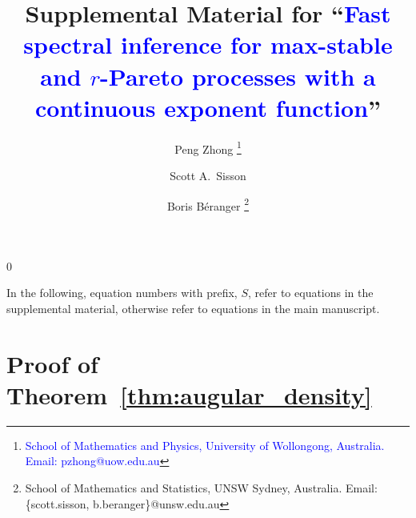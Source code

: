 \documentclass[12pt]{article}
\newcommand{\snum}{S}
\newcommand{\blind}{0}
\begin{document}
\def\spacingset#1{\renewcommand{\baselinestretch}%
{#1}\small\normalsize} \spacingset{1}

\newcommand{\PZ}{\textcolor{blue}}

\newcommand{\symfoot}[2]{%
  \begingroup
  \renewcommand{\thefootnote}{\fnsymbol{footnote}}%
  \setcounter{footnote}{#1}%
  \footnote{#2}%
  \endgroup
}
\newcommand{\symfootmark}[1]{%
  \begingroup
  \renewcommand{\thefootnote}{\fnsymbol{footnote}}%
  \setcounter{footnote}{#1}%
  \footnotemark%
  \endgroup
}

\title{\bf Supplemental Material for ``\PZ{Fast spectral inference for max-stable and $r$-Pareto processes with a continuous exponent function}''}
\blind{
  \author{Peng Zhong\symfoot{1}{\PZ{School of Mathematics and Physics, University of Wollongong, Australia. Email: pzhong@uow.edu.au}}
  \and Scott A.~Sisson\symfootmark{2}
  \and Boris B\'{e}ranger\symfoot{2}{School of Mathematics and Statistics, UNSW Sydney, Australia. Email: \{scott.sisson, b.beranger\}@unsw.edu.au}}
  \maketitle
} \fi

\baselineskip=26pt

\appendix

In the following, equation numbers with prefix, $\snum$, refer to equations in the supplemental material, otherwise refer to equations in the main manuscript.

\section{Proof of Theorem~\ref{thm:augular_density}}
\end{document}
